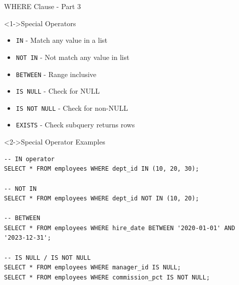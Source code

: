 \documentclass[aspectratio=169,11pt]{beamer}
\begin{document}
\begin{frame}[fragile]{WHERE Clause - Part 3}
\begin{block}<1->{Special Operators}
\begin{itemize}
    \item \texttt{IN} - Match any value in a list
    \item \texttt{NOT IN} - Not match any value in list
    \item \texttt{BETWEEN} - Range inclusive
    \item \texttt{IS NULL} - Check for NULL
    \item \texttt{IS NOT NULL} - Check for non-NULL
    \item \texttt{EXISTS} - Check subquery returns rows
\end{itemize}
\end{block}

\pause
\begin{exampleblock}<2->{Special Operator Examples}
\begin{lstlisting}
-- IN operator
SELECT * FROM employees WHERE dept_id IN (10, 20, 30);

-- NOT IN
SELECT * FROM employees WHERE dept_id NOT IN (10, 20);

-- BETWEEN
SELECT * FROM employees WHERE hire_date BETWEEN '2020-01-01' AND '2023-12-31';

-- IS NULL / IS NOT NULL
SELECT * FROM employees WHERE manager_id IS NULL;
SELECT * FROM employees WHERE commission_pct IS NOT NULL;
\end{lstlisting}
\end{exampleblock}
\end{frame}
\end{document}
